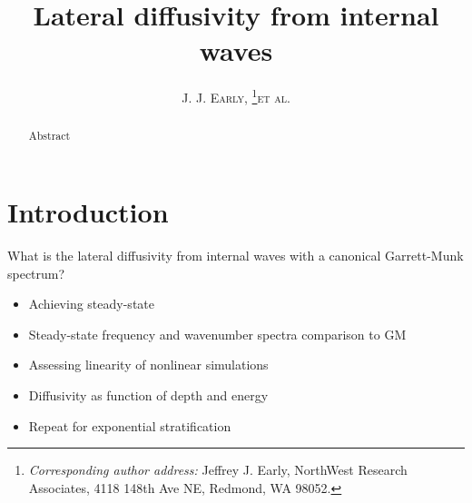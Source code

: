 \documentclass[10pt]{article}
\newcommand{\myabstract}{Abstract}
\begin{document}
%
%
\title{\textbf{\large{Lateral diffusivity from internal waves}}}
%
%
\author{\textsc{J. J. Early,}
				\thanks{\textit{Corresponding author address:} 
				Jeffrey J. Early, NorthWest Research Associates, 
				4118 148th Ave NE, Redmond, WA 98052. 
				}\quad\textsc{et al.}
}
%
{
\twocolumn[
\begin{@twocolumnfalse}
\amstitle

\begin{center}
\begin{minipage}{13.0cm}
\begin{abstract}
	\myabstract
	\newline
	\begin{center}
		\rule{38mm}{0.2mm}
	\end{center}
\end{abstract}
\end{minipage}
\end{center}
\end{@twocolumnfalse}
]
}
{
\amstitle
\begin{abstract}
\myabstract
\end{abstract}
\newpage
}


%
\section{Introduction}
%
What is the lateral diffusivity from internal waves with a canonical Garrett-Munk spectrum?
\begin{itemize}
\item Achieving steady-state
\item Steady-state frequency and wavenumber spectra comparison to GM
\item Assessing linearity of nonlinear simulations
\item Diffusivity as function of depth and energy
\item Repeat for exponential stratification
\end{itemize}
\end{document}
